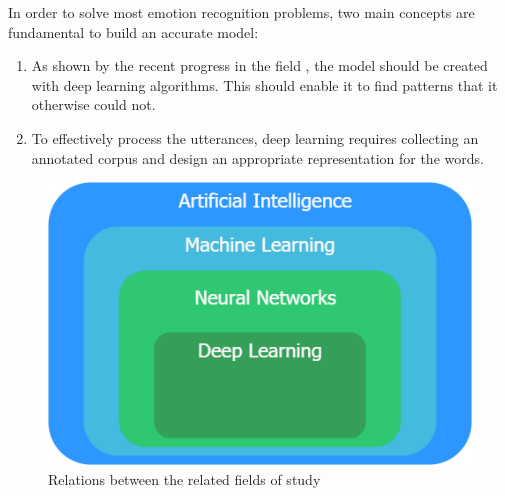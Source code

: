 \documentclass[nofilelist]{cslthse-msc}
\begin{document}

In order to solve most emotion recognition problems, two main concepts are fundamental to build an accurate model:
\begin{enumerate}
\item As shown by the recent progress in the field \citep{deep_survey}, the model should be created with deep learning algorithms. This should enable it to find patterns that it otherwise could not. 
\item To effectively process the utterances, deep learning requires collecting an annotated corpus and design an appropriate representation for the words.
\end{enumerate}


\begin{figure}[h!]
    \centering
    \includegraphics[scale=0.4]{msccls/explanatory_images/map_of_techniques.png}
    \caption{Relations between the related fields of study }
    \label{fig:map}
\end{figure}
\end{document}
